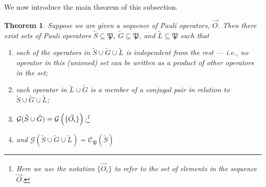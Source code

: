 \documentclass[twocolumn,showpacs,preprintnumbers,amsmath,amssymb,nofootinbib,pra,floatfix]{revtex4-1}
\newtheorem{theorem}{Theorem}
\newcommand{\lst}{\vec}
\newcommand{\set}{\tilde}
\newcommand{\genfun}{\mathcal{G}}
\newcommand{\pauligroup}{\mathfrak{P}}
\newcommand{\centralizer}{\mathcal{C}}
\begin{document}
We now introduce the main theorem of this subsection.

\begin{theorem} \label{theorem-SG} Suppose we are given a sequence of Pauli operators, $\lst O$.  Then there exist sets of Pauli operators $\set S\subseteq\pauligroup$, $\set G\subseteq\pauligroup$, and $\set L\subseteq\pauligroup$ such that
\begin{enumerate}
\item each of the operators in $\set S \cup \set G \cup \set L$ is independent from the rest --- i.e., no operator in this (unioned) set can be written as a product of other operators in the set;
\item each operator in $\set L \cup \set G$ is a member of a conjugal pair in relation to $\set S \cup \set G \cup \set L$;
\item $\genfun(\set S \cup \set G)=\genfun\paren{\{\lst O_i\}}$;\footnote{Here we use the notation $\{\vec{O}_i\}$ to refer to the set of elements in the sequence $\vec{O}$.}
\item and $\genfun(\set S \cup \set G \cup \set L)=\centralizer_\pauligroup(\set S)$
\end{enumerate}
\end{theorem}
\end{document}
